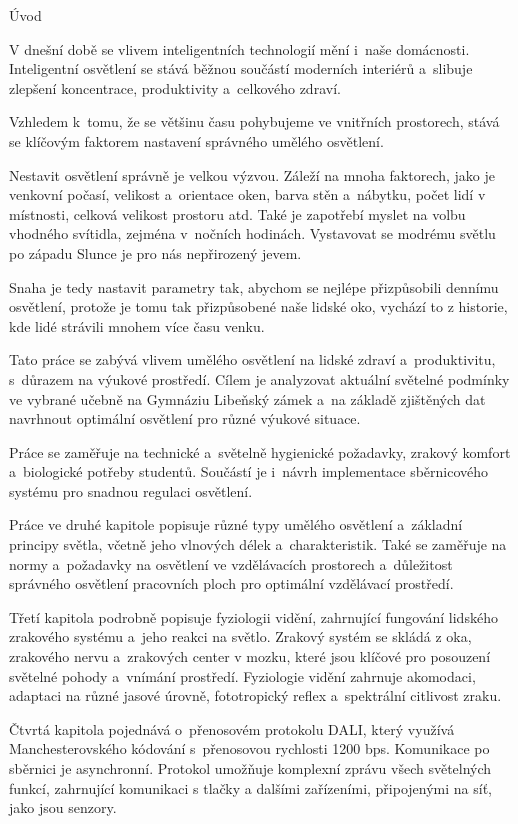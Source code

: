 \chap Úvod

V dnešní době se vlivem inteligentních technologií mění i~naše domácnosti.
Inteligentní osvětlení se stává běžnou součástí moderních interiérů a~slibuje
zlepšení koncentrace, produktivity a~celkového zdraví.

Vzhledem k~tomu, že se většinu času pohybujeme ve vnitřních prostorech,
stává se klíčovým faktorem nastavení správného umělého osvětlení.

Nestavit osvětlení správně je velkou výzvou. Záleží na mnoha faktorech, jako je
venkovní počasí, velikost a~orientace oken, barva stěn a~nábytku, počet lidí v místnosti,
celková velikost prostoru atd. Také je zapotřebí myslet na volbu vhodného svítidla, zejména v~nočních hodinách.
Vystavovat se modrému světlu po západu Slunce je pro nás nepřirozený jevem.

Snaha je tedy nastavit parametry tak, abychom se nejlépe přizpůsobili dennímu osvětlení, protože je tomu tak
přizpůsobené naše lidské oko, vychází to z historie, kde lidé strávili mnohem více času venku.

Tato práce se zabývá vlivem umělého osvětlení na lidské zdraví a~produktivitu,
s~důrazem na výukové prostředí.
Cílem je analyzovat aktuální světelné podmínky ve vybrané učebně
na Gymnáziu Libeňský zámek a~na základě zjištěných dat navrhnout
optimální osvětlení pro různé výukové situace.

Práce se zaměřuje na technické a~světelně hygienické požadavky,
zrakový komfort a~biologické potřeby studentů.
Součástí je i~návrh implementace sběrnicového systému
pro snadnou regulaci osvětlení.

Práce ve druhé kapitole popisuje různé typy umělého
osvětlení a~základní principy světla, včetně jeho vlnových délek a~charakteristik.
Také se zaměřuje na normy a~požadavky na osvětlení ve vzdělávacích
prostorech a~důležitost správného osvětlení pracovních ploch pro optimální vzdělávací prostředí.

Třetí kapitola podrobně popisuje fyziologii vidění, zahrnující
fungování lidského zrakového systému a~jeho reakci na světlo.
Zrakový systém se skládá z oka, zrakového nervu a~zrakových center v mozku,
které jsou klíčové pro posouzení světelné pohody a~vnímání prostředí.
Fyziologie vidění zahrnuje akomodaci, adaptaci na různé jasové úrovně,
fototropický reflex a~spektrální citlivost zraku.

Čtvrtá kapitola pojednává o~přenosovém protokolu DALI, který
využívá Manchesterovského kódování s~přenosovou rychlosti 1200 bps.
Komunikace po sběrnici je asynchronní.
Protokol umožňuje komplexní zprávu všech světelných funkcí, zahrnující komunikaci
s tlačky a dalšími zařízeními, připojenými na síť, jako jsou senzory.

